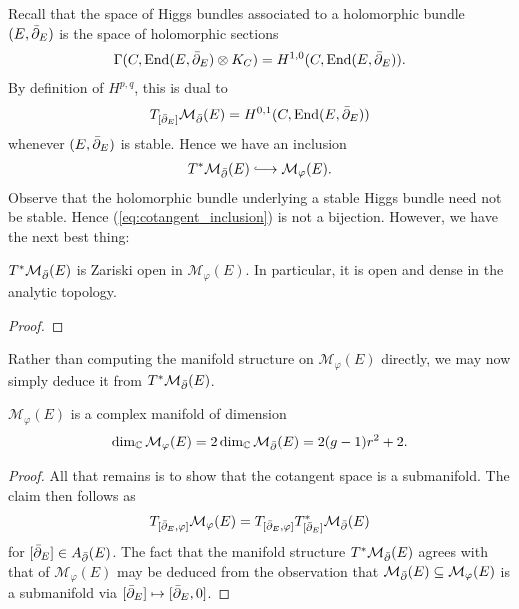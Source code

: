 \documentclass[12pt]{ociamthesis}  %
\begin{document}
Recall that the space of Higgs bundles associated to a holomorphic
bundle $(E,{\bar{\partial}}_E)$ is the space of holomorphic sections
\begin{align*}
  \Gamma(C,\operatorname{End}(E,{\bar{\partial}}_E) \otimes K_C) = H^{1,0}(C,\operatorname{End}(E,{\bar{\partial}}_E)).
\end{align*}
By definition of $H^{p,q}$, this is dual to
\begin{align*}
  T_{[{\bar{\partial}}_E]}\mathcal M_{\bar{\partial}}(E) = H^{0,1}(C,\operatorname{End}(E,{\bar{\partial}}_E))
\end{align*}
whenever $(E,{\bar{\partial}}_E)$ is stable. Hence we have an inclusion
\begin{align}\label{eq:cotangent_inclusion}
  T^*\mathcal M_\dol(E) \longinc\mathcal M_\varphi(E).
\end{align}
Observe that the holomorphic bundle underlying a stable Higgs bundle need
not be stable. Hence (\ref{eq:cotangent_inclusion}) is not a bijection.
However, we have the next best thing:

\begin{theorem}
  $T^*\mathcal M_{\bar{\partial}}(E)$ is Zariski open in $\mathcal M_\varphi(E)$.
  In particular, it is open and dense in the analytic topology.
  \begin{proof}
    \missingproof
  \end{proof}
\end{theorem}

Rather than computing the manifold structure on $\mathcal M_\varphi(E)$
directly, we may now simply deduce it from $T^*\mathcal M_{\bar{\partial}}(E)$.

\begin{corollary}
  $\mathcal M_\varphi(E)$ is a complex manifold of dimension
  \begin{align*}
    \dim_{\mathbb C}\mathcal M_{\varphi}(E)
    =2\dim_{\mathbb C}\mathcal M_{\bar{\partial}}(E)
    =2(g-1)r^2 + 2.
  \end{align*}
  \begin{proof}
    All that remains is to show that the cotangent space is a submanifold.
    The claim then follows as
    \begin{align*}
      T_{[{\bar{\partial}}_E,\varphi]}\mathcal M_\varphi(E) = T_{[{\bar{\partial}}_E,\varphi]} T^*_{[{\bar{\partial}}_E]}\mathcal M_{\bar{\partial}}(E)
    \end{align*}
    for $[{\bar{\partial}}_E]\in A_{\bar{\partial}}(E)$. The fact that the manifold
    structure $T^*\mathcal M_{\bar{\partial}}(E)$ agrees with that of $\mathcal M_{\varphi}(E)$
    may be deduced from the observation that
    $\mathcal M_{\bar{\partial}}(E) \subseteq \mathcal M_\varphi(E)$ is a submanifold
    via $[{\bar{\partial}}_E] \mapsto [{\bar{\partial}}_E,0]$.
  \end{proof}
\end{corollary}
\end{document}
